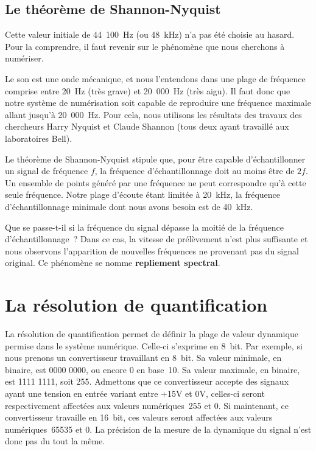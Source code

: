 \documentclass[
]{book}
\begin{document}
\hypertarget{le-thuxe9oruxe8me-de-shannon-nyquist}{%
\subsection{Le théorème de Shannon-Nyquist}\label{le-thuxe9oruxe8me-de-shannon-nyquist}}

Cette valeur initiale de 44~100~Hz (ou 48~kHz) n'a pas été choisie au hasard. Pour la comprendre, il faut revenir sur le phénomène que nous cherchons à numériser.

Le son est une onde mécanique, et nous l'entendons dans une plage de fréquence comprise entre 20~Hz (très grave) et 20~000~Hz (très aigu). Il faut donc que notre système de numérisation soit capable de reproduire une fréquence maximale allant jusqu'à 20~000~Hz. Pour cela, nous utilisons les résultats des travaux des chercheurs Harry Nyquist et Claude Shannon (tous deux ayant travaillé aux laboratoires Bell).

Le théorème de Shannon-Nyquist stipule que, pour être capable d'échantillonner un signal de fréquence \(f\), la fréquence d'échantillonnage doit au moins être de \(2f\). Un ensemble de points généré par une fréquence ne peut correspondre qu'à cette seule fréquence. Notre plage d'écoute étant limitée à 20~kHz, la fréquence d'échantillonnage minimale dont nous avons besoin est de 40~kHz.

Que se passe-t-il si la fréquence du signal dépasse la moitié de la fréquence d'échantillonnage~? Dans ce cas, la vitesse de prélèvement n'est plus suffisante et nous observons l'apparition de nouvelles fréquences ne provenant pas du signal original. Ce phénomène se nomme \textbf{repliement spectral}.

\hypertarget{la-ruxe9solution-de-quantification}{%
\section{La résolution de quantification}\label{la-ruxe9solution-de-quantification}}

La résolution de quantification permet de définir la plage de valeur dynamique permise dans le système numérique. Celle-ci s'exprime en 8~bit. Par exemple, si nous prenons un convertisseur travaillant en 8~bit. Sa valeur minimale, en binaire, est 0000 0000, ou encore 0 en base~10. Sa valeur maximale, en binaire, est 1111 1111, soit 255. Admettons que ce convertisseur accepte des signaux ayant une tension en entrée variant entre +15V et 0V, celles-ci seront respectivement affectées aux valeurs numériques~255 et 0. Si maintenant, ce convertisseur travaille en 16~bit, ces valeurs seront affectées aux valeurs numériques~65535 et 0. La précision de la mesure de la dynamique du signal n'est donc pas du tout la même.
\end{document}
